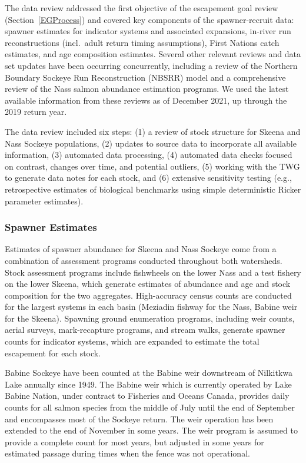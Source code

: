 \documentclass[french,11pt]{book}
\begin{document}
The data review addressed the first objective of the escapement goal review (Section~\ref{EGProcess}) and covered key components of the spawner-recruit data: spawner estimates for indicator systems and associated expansions, in-river run reconstructions (incl.~adult return timing assumptions), First Nations catch estimates, and age composition estimates. Several other relevant reviews and data set updates have been occurring concurrently, including a review of the Northern Boundary Sockeye Run Reconstruction (NBSRR) model and a comprehensive review of the Nass salmon abundance estimation programs. We used the latest available information from these reviews as of December 2021, up through the 2019 return year.

The data review included six steps: (1) a review of stock structure for Skeena and Nass Sockeye populations, (2) updates to source data to incorporate all available information, (3) automated data processing, (4) automated data checks focused on contrast, changes over time, and potential outliers, (5) working with the TWG to generate data notes for each stock, and (6) extensive sensitivity testing (e.g., retrospective estimates of biological benchmarks using simple deterministic Ricker parameter estimates).

\clearpage

\subsubsection{Spawner Estimates}\label{SpnEst}

Estimates of spawner abundance for Skeena and Nass Sockeye come from a combination of assessment programs conducted throughout both watersheds. Stock assessment programs include fishwheels on the lower Nass and a test fishery on the lower Skeena, which generate estimates of abundance and age and stock composition for the two aggregates. High-accuracy census counts are conducted for the largest systems in each basin (Meziadin fishway for the Nass, Babine weir for the Skeena). Spawning ground enumeration programs, including weir counts, aerial surveys, mark-recapture programs, and stream walks, generate spawner counts for indicator systems, which are expanded to estimate the total escapement for each stock.

Babine Sockeye have been counted at the Babine weir downstream of Nilkitkwa Lake annually since 1949. The Babine weir which is currently operated by Lake Babine Nation, under contract to Fisheries and Oceans Canada, provides daily counts for all salmon species from the middle of July until the end of September and encompasses most of the Sockeye return. The weir operation has been extended to the end of November in some years. The weir program is assumed to provide a complete count for most years, but adjusted in some years for estimated passage during times when the fence was not operational.
\end{document}
